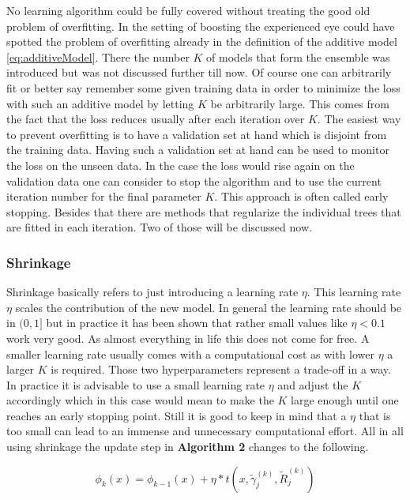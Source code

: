\documentclass[
]{book}
\begin{document}
No learning algorithm could be fully covered without treating the good old problem of overfitting. In the setting of boosting the experienced eye could have spotted the problem of overfitting already in the definition of the additive model \eqref{eq:additiveModel}. There the number \(K\) of models that form the ensemble was introduced but was not discussed further till now. Of course one can arbitrarily fit or better say remember some given training data in order to minimize the loss with such an additive model by letting \(K\) be arbitrarily large. This comes from the fact that the loss reduces usually after each iteration over \(K\).\citep{elements} The easiest way to prevent overfitting is to have a validation set at hand which is disjoint from the training data. Having such a validation set at hand can be used to monitor the loss on the unseen data. In the case the loss would rise again on the validation data one can consider to stop the algorithm and to use the current iteration number for the final parameter \(K\). This approach is often called early stopping. Besides that there are methods that regularize the individual trees that are fitted in each iteration. Two of those will be discussed now.

\hypertarget{shrinkage}{%
\subsubsection{Shrinkage}\label{shrinkage}}

Shrinkage basically refers to just introducing a learning rate \(\eta\). This learning rate \(\eta\) scales the contribution of the new model. In general the learning rate should be in \((0,1]\) but in practice it has been shown that rather small values like \(\eta < 0.1\) work very good.\citep{elements} As almost everything in life this does not come for free. A smaller learning rate usually comes with a computational cost as with lower \(\eta\) a larger \(K\) is required. Those two hyperparameters represent a trade-off in a way. In practice it is advisable to use a small learning rate \(\eta\) and adjust the \(K\) accordingly which in this case would mean to make the \(K\) large enough until one reaches an early stopping point. Still it is good to keep in mind that a \(\eta\) that is too small can lead to an immense and unnecessary computational effort. All in all using shrinkage the update step in \textbf{Algorithm 2} changes to the following.

\begin{equation}
  \phi_k(x) = \phi_{k-1}(x) + \eta * t(x,\tilde {\gamma}^{(k)}_{j},\tilde{R}^{(k)}_j)
  \label{eq:shrinkage}
\end{equation}
\end{document}
